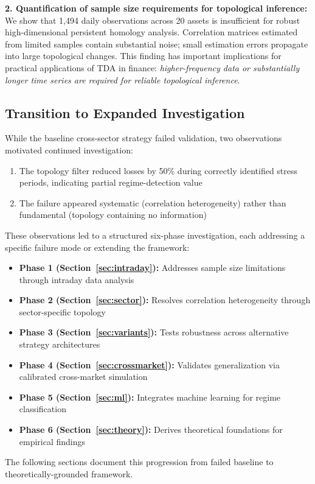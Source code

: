 \textbf{2. Quantification of sample size requirements for topological inference:} We show that 1,494 daily observations across 20 assets is insufficient for robust high-dimensional persistent homology analysis. Correlation matrices estimated from limited samples contain substantial noise; small estimation errors propagate into large topological changes. This finding has important implications for practical applications of TDA in finance: \textit{higher-frequency data or substantially longer time series are required for reliable topological inference}.

\subsection{Transition to Expanded Investigation}

While the baseline cross-sector strategy failed validation, two observations motivated continued investigation:

\begin{enumerate}
\item The topology filter reduced losses by 50\% during correctly identified stress periods, indicating partial regime-detection value
\item The failure appeared systematic (correlation heterogeneity) rather than fundamental (topology containing no information)
\end{enumerate}

These observations led to a structured six-phase investigation, each addressing a specific failure mode or extending the framework:

\begin{itemize}
\item \textbf{Phase 1 (Section~\ref{sec:intraday}):} Addresses sample size limitations through intraday data analysis
\item \textbf{Phase 2 (Section~\ref{sec:sector}):} Resolves correlation heterogeneity through sector-specific topology
\item \textbf{Phase 3 (Section~\ref{sec:variants}):} Tests robustness across alternative strategy architectures
\item \textbf{Phase 4 (Section~\ref{sec:crossmarket}):} Validates generalization via calibrated cross-market simulation
\item \textbf{Phase 5 (Section~\ref{sec:ml}):} Integrates machine learning for regime classification
\item \textbf{Phase 6 (Section~\ref{sec:theory}):} Derives theoretical foundations for empirical findings
\end{itemize}

The following sections document this progression from failed baseline to theoretically-grounded framework.

